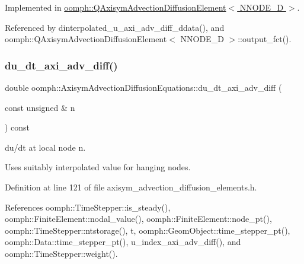 Implemented in \hyperlink{classoomph_1_1QAxisymAdvectionDiffusionElement_aa940ad09f185dfde0eaeff61bc9c0a31}{oomph\+::\+Q\+Axisym\+Advection\+Diffusion\+Element$<$ N\+N\+O\+D\+E\+\_\+D $>$}.



Referenced by dinterpolated\+\_\+u\+\_\+axi\+\_\+adv\+\_\+diff\+\_\+ddata(), and oomph\+::\+Q\+Axisym\+Advection\+Diffusion\+Element$<$ N\+N\+O\+D\+E\+\_\+D $>$\+::output\+\_\+fct().

\mbox{\label{classoomph_1_1AxisymAdvectionDiffusionEquations_a5d89673630363ecbf7fe1e1b7f2d6c31}} 
\subsubsection{\texorpdfstring{du\+\_\+dt\+\_\+axi\+\_\+adv\+\_\+diff()}{du\_dt\_axi\_adv\_diff()}}
{\footnotesize\ttfamily double oomph\+::\+Axisym\+Advection\+Diffusion\+Equations\+::du\+\_\+dt\+\_\+axi\+\_\+adv\+\_\+diff (\begin{DoxyParamCaption}\item[{const unsigned \&}]{n }\end{DoxyParamCaption}) const\hspace{0.3cm}{\ttfamily [inline]}}



du/dt at local node n. 

Uses suitably interpolated value for hanging nodes. 

Definition at line 121 of file axisym\+\_\+advection\+\_\+diffusion\+\_\+elements.\+h.



References oomph\+::\+Time\+Stepper\+::is\+\_\+steady(), oomph\+::\+Finite\+Element\+::nodal\+\_\+value(), oomph\+::\+Finite\+Element\+::node\+\_\+pt(), oomph\+::\+Time\+Stepper\+::ntstorage(), t, oomph\+::\+Geom\+Object\+::time\+\_\+stepper\+\_\+pt(), oomph\+::\+Data\+::time\+\_\+stepper\+\_\+pt(), u\+\_\+index\+\_\+axi\+\_\+adv\+\_\+diff(), and oomph\+::\+Time\+Stepper\+::weight().



